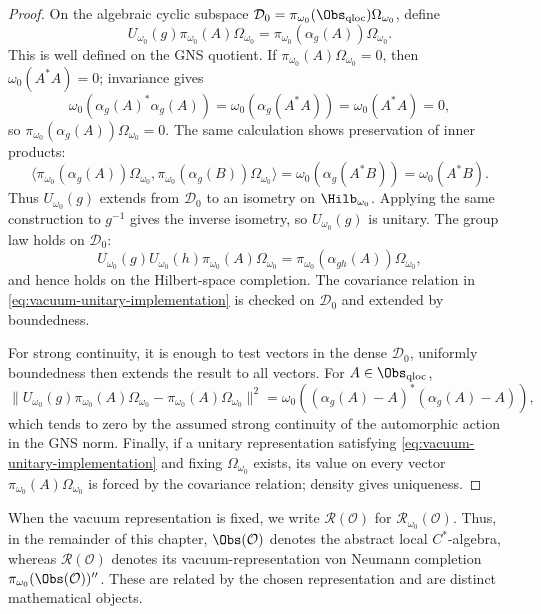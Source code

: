 \begin{proof}
On the algebraic cyclic subspace
\(\mathcal D_0=\pi_{\omega_0}(\Obs_{\rm qloc})\Omega_{\omega_0}\), define
\[
  U_{\omega_0}(g)\pi_{\omega_0}(A)\Omega_{\omega_0}
  =
  \pi_{\omega_0}(\alpha_g(A))\Omega_{\omega_0}.
\]
This is well defined on the GNS quotient.  If
\(\pi_{\omega_0}(A)\Omega_{\omega_0}=0\), then
\(\omega_0(A^*A)=0\); invariance gives
\[
  \omega_0(\alpha_g(A)^*\alpha_g(A))
  =
  \omega_0(\alpha_g(A^*A))
  =
  \omega_0(A^*A)=0,
\]
so \(\pi_{\omega_0}(\alpha_g(A))\Omega_{\omega_0}=0\).  The same
calculation shows preservation of inner products:
\[
  \langle\pi_{\omega_0}(\alpha_g(A))\Omega_{\omega_0},
  \pi_{\omega_0}(\alpha_g(B))\Omega_{\omega_0}\rangle
  =
  \omega_0(\alpha_g(A^*B))
  =
  \omega_0(A^*B).
\]
Thus \(U_{\omega_0}(g)\) extends from \(\mathcal D_0\) to an isometry on
\(\Hilb_{\omega_0}\).  Applying the same construction to \(g^{-1}\) gives
the inverse isometry, so \(U_{\omega_0}(g)\) is unitary.  The group law holds
on \(\mathcal D_0\):
\[
  U_{\omega_0}(g)U_{\omega_0}(h)\pi_{\omega_0}(A)\Omega_{\omega_0}
  =
  \pi_{\omega_0}(\alpha_{gh}(A))\Omega_{\omega_0},
\]
and hence holds on the Hilbert-space completion.  The covariance relation in
\eqref{eq:vacuum-unitary-implementation} is checked on
\(\mathcal D_0\) and extended by boundedness.

For strong continuity, it is enough to test vectors in the dense
\(\mathcal D_0\), uniformly boundedness then extends the result to all
vectors.  For \(A\in\Obs_{\rm qloc}\),
\[
  \|U_{\omega_0}(g)\pi_{\omega_0}(A)\Omega_{\omega_0}
      -\pi_{\omega_0}(A)\Omega_{\omega_0}\|^2
  =
  \omega_0\!\left(
    (\alpha_g(A)-A)^*(\alpha_g(A)-A)
  \right),
\]
which tends to zero by the assumed strong continuity of the automorphic
action in the GNS norm.  Finally, if a unitary representation satisfying
\eqref{eq:vacuum-unitary-implementation} and fixing \(\Omega_{\omega_0}\)
exists, its value on every vector
\(\pi_{\omega_0}(A)\Omega_{\omega_0}\) is forced by the covariance relation;
density gives uniqueness.
\end{proof}

When the vacuum representation is fixed, we write \(\mathcal R(\mathcal O)\)
for \(\mathcal R_{\omega_0}(\mathcal O)\).  Thus, in the remainder of this
chapter, \(\Obs(\mathcal O)\) denotes the abstract local \(C^*\)-algebra,
whereas \(\mathcal R(\mathcal O)\) denotes its vacuum-representation von
Neumann completion \(\pi_{\omega_0}(\Obs(\mathcal O))''\).  These are related
by the chosen representation and are distinct mathematical objects.

